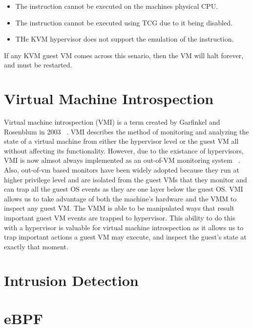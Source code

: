 \documentclass{report}
\begin{document}
\begin{spacing}{1.5}
{\begin{itemize}
\item  The instruction cannot be executed on the machines physical CPU.
\item  The instruction cannot be executed using TCG due to it being disabled.
\item  THe KVM hypervisor does not support the emulation of the instruction.

\end{itemize}

\leavevmode\newline
If any KVM guest VM comes across this senario, then the VM will halt forever, and must be restarted.
}








\section{Virtual Machine Introspection}

Virtual machine introspection (VMI) is a term created by Garfinkel and Rosenblum in 2003 ~\cite{garfinkel2003virtual}. VMI describes the method of monitoring and analyzing the state of a virtual machine from either the hypervisor level or the guest VM all without affecting its functionality. However, due to the existance of hypervisors, VMI is now almsot always implemented as an out-of-VM monitoring system ~\cite{bhatt2018using}. Also, out-of-vm based monitors have been widely adopted because they run at higher privilege level and are isolated from the guest VMs that they monitor and can trap all the guest OS events as they are one layer below the guest OS. VMI allows us to take advantage of both the machine's hardware and the VMM to inspect any guest VM. The VMM is able to be manipulated ways that result important guest VM events are trapped to hypervisor. This ability to do this with a hypervisor is valuable for virtual machine introspection as it allows us to trap important actions a guest VM may execute, and inspect the guest’s state at exactly that moment.



\section{Intrusion Detection}






\section{eBPF}







\end{spacing}
\end{document}
